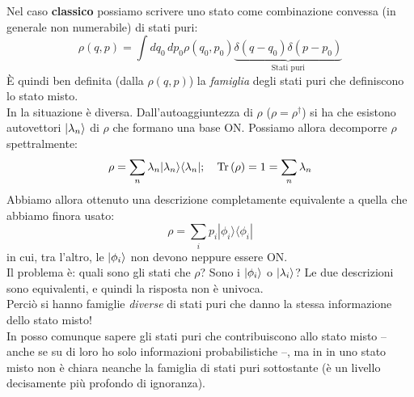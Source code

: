 \documentclass[../../FisicaTeorica.tex]{subfiles}
\begin{document}
Nel caso \textbf{classico} possiamo scrivere uno stato come combinazione convessa (in generale non numerabile) di stati puri:
\[
\rho \left(q,p\right)=\int dq_0\,dp_0 \rho \left(q_0,p_0\right) \underbrace{\delta \left(q-q_0\right)\delta \left(p-p_0\right)}_{\text{Stati puri}}
\]
È quindi ben definita (dalla $\rho(q,p)$) la \textit{famiglia} degli stati puri che definiscono lo stato misto.\\
In \MQ la situazione è diversa. Dall'autoaggiuntezza di $\rho$  ($\rho = \rho^\dag$) si ha che esistono autovettori $\Ket{\lambda_n}$ di $\rho$ che formano una base ON. Possiamo allora
decomporre $\rho$ spettralmente:
\[
\rho =\sum_{n}{\lambda_n|\lambda_n\rangle\langle\lambda_n|};\quad \operatorname{Tr}\left(\rho\right)=1= \sum_{n}\lambda_n
\]
Abbiamo allora ottenuto una descrizione completamente equivalente a quella che abbiamo finora usato:
\[
\rho = \sum_{i}{p_i|\phi_i\rangle\langle\phi_i|}
\]
in cui, tra l'altro, le $\Ket{\phi_i}$ non devono neppure essere ON.\\
Il problema è: quali sono gli stati che  $\rho$? Sono i $\Ket{\phi_i}$ o $\Ket{\lambda_i}$? Le due descrizioni sono equivalenti, e quindi la risposta non è univoca.\\
Perciò si hanno famiglie \textit{diverse} di stati puri che danno la stessa informazione dello stato misto!\\
In \MC posso comunque sapere gli stati puri che contribuiscono allo stato misto -- anche se su di loro ho solo informazioni probabilistiche --, ma in \MQ in uno stato misto non è chiara neanche la famiglia di stati puri sottostante (è un livello decisamente più profondo di ignoranza).
\end{document}
